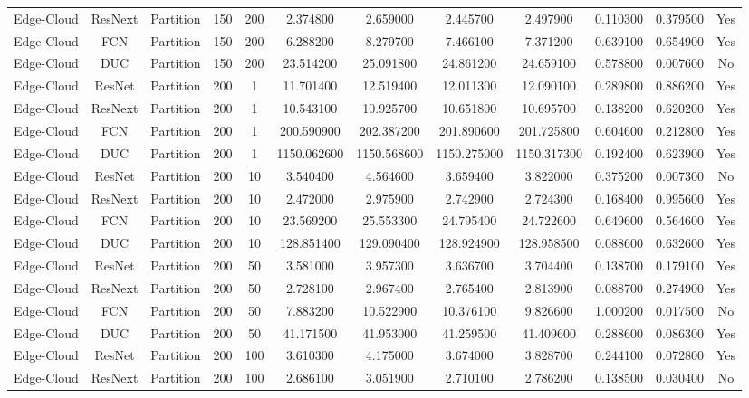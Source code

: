 \begin{tabular}{|c||c||c||c||c||c||c||c||c||c||c||c|}
Edge-Cloud & ResNext & Partition & 150 & 200 & 2.374800 & 2.659000 & 2.445700 & 2.497900 & 0.110300 & 0.379500 & Yes \\
Edge-Cloud & FCN & Partition & 150 & 200 & 6.288200 & 8.279700 & 7.466100 & 7.371200 & 0.639100 & 0.654900 & Yes \\
Edge-Cloud & DUC & Partition & 150 & 200 & 23.514200 & 25.091800 & 24.861200 & 24.659100 & 0.578800 & 0.007600 & No \\
Edge-Cloud & ResNet & Partition & 200 & 1 & 11.701400 & 12.519400 & 12.011300 & 12.090100 & 0.289800 & 0.886200 & Yes \\
Edge-Cloud & ResNext & Partition & 200 & 1 & 10.543100 & 10.925700 & 10.651800 & 10.695700 & 0.138200 & 0.620200 & Yes \\
Edge-Cloud & FCN & Partition & 200 & 1 & 200.590900 & 202.387200 & 201.890600 & 201.725800 & 0.604600 & 0.212800 & Yes \\
Edge-Cloud & DUC & Partition & 200 & 1 & 1150.062600 & 1150.568600 & 1150.275000 & 1150.317300 & 0.192400 & 0.623900 & Yes \\
Edge-Cloud & ResNet & Partition & 200 & 10 & 3.540400 & 4.564600 & 3.659400 & 3.822000 & 0.375200 & 0.007300 & No \\
Edge-Cloud & ResNext & Partition & 200 & 10 & 2.472000 & 2.975900 & 2.742900 & 2.724300 & 0.168400 & 0.995600 & Yes \\
Edge-Cloud & FCN & Partition & 200 & 10 & 23.569200 & 25.553300 & 24.795400 & 24.722600 & 0.649600 & 0.564600 & Yes \\
Edge-Cloud & DUC & Partition & 200 & 10 & 128.851400 & 129.090400 & 128.924900 & 128.958500 & 0.088600 & 0.632600 & Yes \\
Edge-Cloud & ResNet & Partition & 200 & 50 & 3.581000 & 3.957300 & 3.636700 & 3.704400 & 0.138700 & 0.179100 & Yes \\
Edge-Cloud & ResNext & Partition & 200 & 50 & 2.728100 & 2.967400 & 2.765400 & 2.813900 & 0.088700 & 0.274900 & Yes \\
Edge-Cloud & FCN & Partition & 200 & 50 & 7.883200 & 10.522900 & 10.376100 & 9.826600 & 1.000200 & 0.017500 & No \\
Edge-Cloud & DUC & Partition & 200 & 50 & 41.171500 & 41.953000 & 41.259500 & 41.409600 & 0.288600 & 0.086300 & Yes \\
Edge-Cloud & ResNet & Partition & 200 & 100 & 3.610300 & 4.175000 & 3.674000 & 3.828700 & 0.244100 & 0.072800 & Yes \\
Edge-Cloud & ResNext & Partition & 200 & 100 & 2.686100 & 3.051900 & 2.710100 & 2.786200 & 0.138500 & 0.030400 & No \\

\end{tabular}
